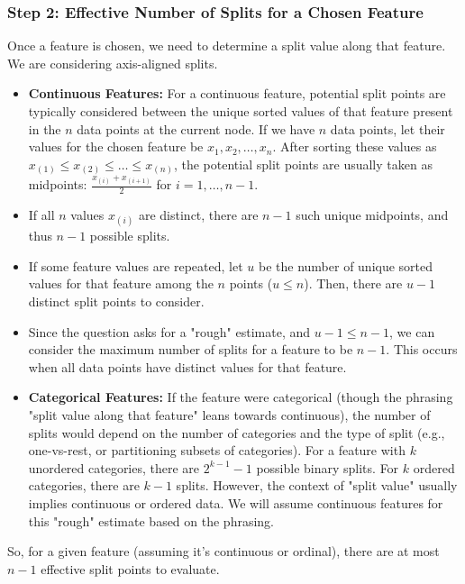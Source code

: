 \documentclass{article}
\begin{document}
\subsubsection*{Step 2: Effective Number of Splits for a Chosen Feature}
\parbox{\textwidth}{
Once a feature is chosen, we need to determine a split value along that feature. We are considering axis-aligned splits.
\begin{itemize}
    \item \textbf{Continuous Features:} For a continuous feature, potential split points are typically considered between the unique sorted values of that feature present in the $n$ data points at the current node. If we have $n$ data points, let their values for the chosen feature be $x_1, x_2, \ldots, x_n$. After sorting these values as $x_{(1)} \le x_{(2)} \le \ldots \le x_{(n)}$, the potential split points are usually taken as midpoints: $\frac{x_{(i)} + x_{(i+1)}}{2}$ for $i = 1, \ldots, n-1$.
    \item If all $n$ values $x_{(i)}$ are distinct, there are $n-1$ such unique midpoints, and thus $n-1$ possible splits.
    \item If some feature values are repeated, let $u$ be the number of unique sorted values for that feature among the $n$ points ($u \le n$). Then, there are $u-1$ distinct split points to consider.
    \item Since the question asks for a "rough" estimate, and $u-1 \le n-1$, we can consider the maximum number of splits for a feature to be $n-1$. This occurs when all data points have distinct values for that feature.
    \item \textbf{Categorical Features:} If the feature were categorical (though the phrasing "split value along that feature" leans towards continuous), the number of splits would depend on the number of categories and the type of split (e.g., one-vs-rest, or partitioning subsets of categories). For a feature with $k$ unordered categories, there are $2^{k-1}-1$ possible binary splits. For $k$ ordered categories, there are $k-1$ splits. However, the context of "split value" usually implies continuous or ordered data. We will assume continuous features for this "rough" estimate based on the phrasing.
\end{itemize}
So, for a given feature (assuming it's continuous or ordinal), there are at most $n-1$ effective split points to evaluate.
}
\end{document}
